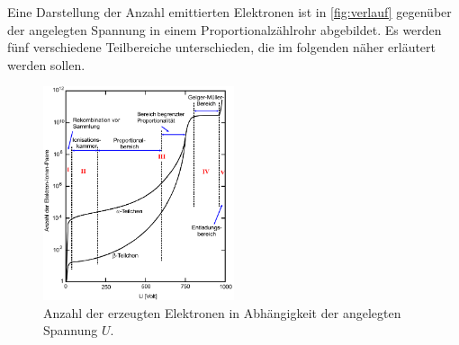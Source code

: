 Eine Darstellung der Anzahl emittierten Elektronen ist in \autoref{fig:verlauf} gegenüber der angelegten Spannung in einem Proportionalzählrohr abgebildet.
Es werden fünf verschiedene Teilbereiche unterschieden, die im folgenden näher erläutert werden sollen.
\begin{figure}[H]
    \centering
    \includegraphics[width=0.5\textwidth]{data/verlauf.png}
    \caption{Anzahl der erzeugten Elektronen in Abhängigkeit der angelegten Spannung $U$.}
    \label{fig:verlauf}
\end{figure}

